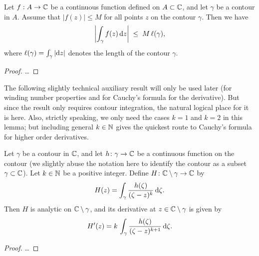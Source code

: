 \begin{corollary}
  \label{lem:contour_integral_bound}
  Let $f : A \to \mathbb{C}$ be a continuous function defined on $A \subset \mathbb{C}$,
  and let $\gamma$ be a contour in $A$.
  Assume that $|f(z)| \le M$ for all points $z$ on the contour $\gamma$.
  Then we have
  \begin{align*}
    \left| \int_\gamma f(z) \, \mathrm{d} z \right| \; \le \; M \, \ell(\gamma) ,
  \end{align*}
  where $\ell(\gamma) = \int_\gamma |\mathrm{d} z|$ denotes the length of
  the contour $\gamma$.
\end{corollary}
\begin{proof}
  \ldots
\end{proof}

The following slightly technical auxiliary result will only be used later
(for winding number properties and for Cauchy's formula for the derivative).
But since the result only requires contour integration,
the natural logical place for it is here. Also, strictly speaking, we
only need the cases $k = 1$ and $k = 2$ in this lemma; but including
general $k \in \mathbb{N}$ gives the quickest route to Cauchy's formula for
higher order derivatives.

\begin{lemma}
  \label{lem:derivative_auxiliary_integral}
  Let $\gamma$ be a contour in $\mathbb{C}$, and let $h \colon \gamma \to \mathbb{C}$
  be a continuous function on the contour (we slightly abuse the notation
  here to identify the contour as a subset $\gamma \subset \mathbb{C}$).
  Let $k \in \mathbb{N}$ be a positive integer.
  Define $H \colon \mathbb{C} \setminus \gamma \to \mathbb{C}$ by
  \begin{align*}
    H(z) = \int_\gamma \frac{h(\zeta)}{(\zeta - z)^{k}} \, \mathrm{d} \zeta .
  \end{align*}
  Then $H$ is analytic on $\mathbb{C} \setminus \gamma$, and its derivative
  at $z \in \mathbb{C} \setminus \gamma$ is given by
  \begin{align*}
    H'(z) = k \, \int_\gamma \frac{h(\zeta)}{(\zeta - z)^{k+1}} \, \mathrm{d} \zeta .
  \end{align*}
\end{lemma}
\begin{proof}
  \ldots
\end{proof}



